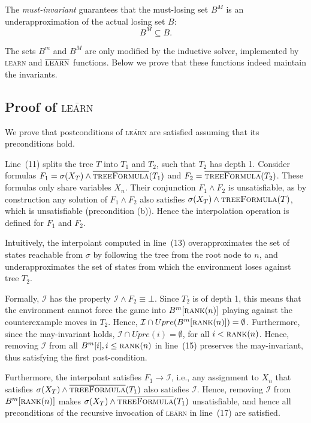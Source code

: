 \documentclass{llncs}
\newcommand{\II}{\mathcal{I}}
\newcommand{\textoverline}[1]{$\overline{\mbox{#1}}$}
\begin{document}
The \emph{must-invariant} guarantees that the must-losing set $B^M$ is an
underapproximation of the actual losing set $B$: $$B^M \subseteq B.$$

The sets $B^m$ and $B^M$ are only modified by the inductive solver, implemented
by \textsc{learn} and \textoverline{\textsc{learn}} functions.  Below we prove that these
functions indeed maintain the invariants.

\subsection{Proof of \textsc{\textoverline{learn}}}

We prove that postconditions of \textsc{\textoverline{learn}} are satisfied
assuming that its preconditions hold.

Line~(11) splits the tree $T$ into $T_1$ and $T_2$, such that $T_2$ has depth
1.  Consider formulas $F_1=\sigma(X_T) \land
\textsc{\textoverline{treeFormula}}(T_1)$ and $F_2 =
\textsc{\textoverline{treeFormula}}(T_2)$.  These formulas only share variables
$X_n$.  Their conjunction $F_1 \land F_2$ is unsatisfiable, as by construction
any solution of $F_1 \land F_2$ also satisfies $\sigma(X_T) \land
\textsc{treeFormula}(T)$, which is unsatisfiable (precondition (b)).  Hence the
interpolation operation is defined for $F_1$ and $F_2$.  

Intuitively, the interpolant computed in line~(13) overapproximates the set of
states reachable from $\sigma$ by following the tree from the root node to $n$,
and underapproximates the set of states from which the environment loses
against tree $T_2$.  

Formally, $\II$ has the property $\II \land F_2 \equiv \bot$.  Since $T_2$ is
of depth 1, this means that the environment cannot force the game into
$B^m[\textsc{rank}(n)]$ playing against the counterexample moves in $T_2$.
Hence, $\II \cap Upre(B^m[\textsc{rank}(n)]) = \emptyset$.  Furthermore, since
the may-invariant holds, $\II \cap Upre(i) = \emptyset$, for all $i <
\textsc{rank}(n)$.  Hence, removing $\II$ from all $B^m[i], i\leq
\textsc{rank}(n)$ in line~(15) preserves the may-invariant, thus satisfying the
first post-condition.

Furthermore, the interpolant satisfies $F_1 \rightarrow \II$, i.e., any
assignment to $X_n$ that satisfies $\sigma(X_T) \land
\textsc{\textoverline{treeFormula}}(T_1)$ also satisfies $\II$.  Hence,
removing $\II$ from $B^m[\textsc{rank}(n)]$ makes $\sigma(X_T) \land
\textsc{\textoverline{treeFormula}}(T_1)$ unsatisfiable, and hence all
preconditions of the recursive invocation of \textsc{\textoverline{learn}} in
line~(17) are satisfied.  
\end{document}
